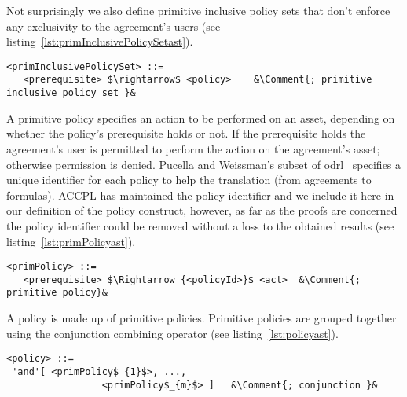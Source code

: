 Not surprisingly we also define primitive inclusive policy sets that don't enforce any exclusivity to the agreement's users (see listing~\ref{lst:primInclusivePolicySetast}).

\lstset{mathescape, language=AST, escapechar=\&}  
\begin{lstlisting}[frame=single, caption={primInclusivePolicySet},label={lst:primInclusivePolicySetast}]
<primInclusivePolicySet> ::=  
   <prerequisite> $\rightarrow$ <policy>	&\Comment{; primitive inclusive policy set }&
\end{lstlisting}


A primitive policy specifies an action to be performed on an asset, depending on whether the policy's prerequisite holds or not. If the prerequisite holds the agreement's user is permitted to perform the action on the agreement's asset; otherwise permission is denied. Pucella and Weissman's subset of \ac{odrl}~\cite{pucella2006} specifies a unique identifier for each policy to help the translation (from agreements to formulas). \ac{ACCPL} has maintained the policy identifier and we include it here in our definition of the policy construct, however, as far as the proofs are concerned the policy identifier could be removed without a loss to the obtained results (see listing~\ref{lst:primPolicyast}).


\lstset{mathescape, language=AST, escapechar=\&}  
\begin{minipage}[c]{0.95\textwidth}
\begin{lstlisting}[frame=single, caption={primPolicy},label={lst:primPolicyast}]
<primPolicy> ::=  
   <prerequisite> $\Rightarrow_{<policyId>}$ <act> 	&\Comment{; primitive policy}&
\end{lstlisting}
\end{minipage}

A policy is made up of primitive policies. Primitive policies are grouped together using the conjunction combining operator (see listing~\ref{lst:policyast}).

\lstset{mathescape, language=AST, escapechar=\&}  
\begin{minipage}[c]{0.95\textwidth}
\begin{lstlisting}[frame=single, caption={policy},label={lst:policyast}]
<policy> ::=  
 'and'[ <primPolicy$_{1}$>, ..., 
                 <primPolicy$_{m}$> ]	&\Comment{; conjunction }&
\end{lstlisting}
\end{minipage}

